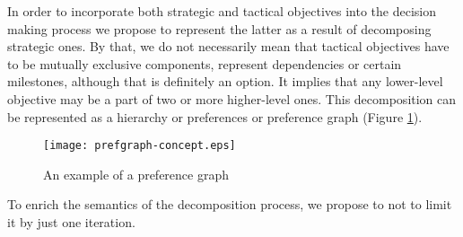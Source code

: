 



In order to incorporate both strategic and tactical objectives into the decision making process we propose to represent
the latter as a result of decomposing strategic ones. By that, we do not necessarily mean that tactical objectives have
to be mutually exclusive components, represent dependencies or certain milestones, although that is definitely an
option. It implies that any lower-level objective may be a part of two or more higher-level ones. This decomposition can
be represented as a hierarchy or preferences or preference graph (Figure \ref{fig:prefgraph-concept}).

\begin{figure}[hbt!]
    \centering
    \texttt{[image: prefgraph-concept.eps]}

    \caption{\small An example of a preference graph}
    \label{fig:prefgraph-concept}
\end{figure}

To enrich
the semantics of the decomposition process, we propose to not to limit it by just one iteration.
